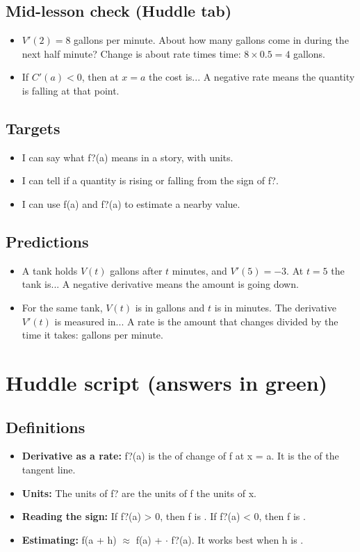 \documentclass[11pt]{article}
\begin{document}
\subsection*{Mid-lesson check (Huddle tab)}\begin{itemize}
\item $V'(2)=8$ gallons per minute. About how many gallons come in during the next half minute?  Change is about rate times time: $8\times0.5=4$ gallons.
\item If $C'(a)<0$, then at $x=a$ the cost is...  A negative rate means the quantity is falling at that point.
\end{itemize}
\subsection*{Targets}\begin{itemize}\item I can say what f?(a) means in a story, with units.
\item I can tell if a quantity is rising or falling from the sign of f?.
\item I can use f(a) and f?(a) to estimate a nearby value.\end{itemize}
\subsection*{Predictions}\begin{itemize}
\item A tank holds $V(t)$ gallons after $t$ minutes, and $V'(5)=-3$. At $t=5$ the tank is...  A negative derivative means the amount is going down.
\item For the same tank, $V(t)$ is in gallons and $t$ is in minutes. The derivative $V'(t)$ is measured in...  A rate is the amount that changes divided by the time it takes: gallons per minute.
\end{itemize}
\section*{Huddle script (answers in green)}
\subsection*{Definitions}\begin{itemize}
\item \textbf{Derivative as a rate:} f?(a) is the  of change of f at x = a. It is the  of the tangent line.
\item \textbf{Units:} The units of f? are the units of f  the units of x.
\item \textbf{Reading the sign:} If f?(a) > 0, then f is . If f?(a) < 0, then f is .
\item \textbf{Estimating:} f(a + h) $\approx$ f(a) +  $\cdot$ f?(a). It works best when h is .
\end{itemize}
\end{document}
